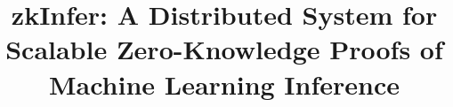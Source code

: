 \documentclass[sigconf,natbib=false]{acmart}
\begin{document}

\title{zkInfer: A Distributed System for Scalable Zero-Knowledge Proofs of Machine Learning Inference}











\end{document}
